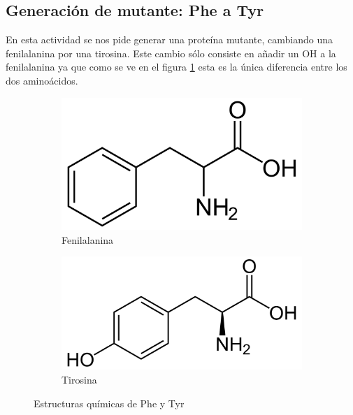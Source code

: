 \documentclass[a4paper,11pt]{report}
\begin{document}
 \subsection{Generación de mutante: Phe a Tyr}
 En esta actividad se nos pide generar una proteína mutante, cambiando una fenilalanina por una tirosina. Este cambio sólo consiste en añadir un OH a la fenilalanina ya que como se ve en el figura \ref{fig: phe} esta es la única diferencia entre los dos aminoácidos.
  \begin{figure}[h!]
 	\centering
 	\begin{subfigure}{0.45\textwidth}
 		\includegraphics[width=\linewidth]{Figuras/Figura27}
 		\caption{Fenilalanina}
 	\end{subfigure}   
 	\begin{subfigure}{0.45\textwidth}
 		\includegraphics[width=1.1\linewidth]{Figuras/Figura28}
 		\caption{Tirosina}
 	\end{subfigure}
 	
 	\caption{Estructuras químicas de Phe y Tyr}
 	\label{fig: phe}
 	
 \end{figure}
\end{document}
